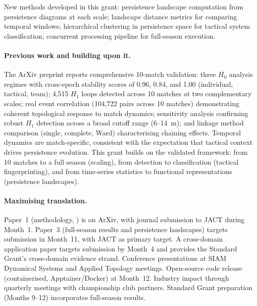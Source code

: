 New methods developed in this grant: persistence landscape computation from persistence diagrams at each scale; landscape distance metrics for comparing temporal windows; hierarchical clustering in persistence space for tactical system classification; concurrent processing pipeline for full-season execution.

\paragraph{Previous work and building upon it.}
The ArXiv preprint \citep{Brown2026} reports comprehensive 10-match validation: three $H_0$ analysis regimes with cross-epoch stability scores of 0.96, 0.84, and 1.00 (individual, tactical, team); 4{,}515 $H_1$ loops detected across 10 matches at two complementary scales; real event correlation (104{,}722 pairs across 10 matches) demonstrating coherent topological response to match dynamics; sensitivity analysis confirming robust $H_1$ detection across a broad cutoff range (6--14~m); and linkage method comparison (single, complete, Ward) characterising chaining effects. Temporal dynamics are match-specific, consistent with the expectation that tactical context drives persistence evolution. This grant builds on the validated framework: from 10 matches to a full season (scaling), from detection to classification (tactical fingerprinting), and from time-series statistics to functional representations (persistence landscapes).

\paragraph{Maximising translation.}
Paper~1 (methodology, \citealp{Brown2026}) is on ArXiv, with journal submission to JACT during Month~1. Paper~3 (full-season results and persistence landscapes) targets submission in Month~11, with JACT as primary target. A cross-domain application paper \citep{Brown2026inprep} targets submission by Month~4 and provides the Standard Grant's cross-domain evidence strand. Conference presentations at SIAM Dynamical Systems and Applied Topology meetings. Open-source code release (containerised, Apptainer/Docker) at Month~12. Industry impact through quarterly meetings with championship club partners. Standard Grant preparation (Months 9--12) incorporates full-season results.

